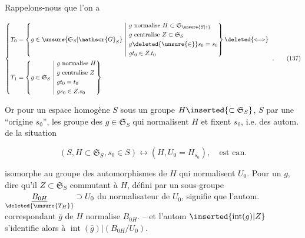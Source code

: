 Rappelons-nous que l'on a

\[\left\{\begin{aligned}
T_0&=\left\{g\in\unsure{\mathfrak{S}_S|\mathscr{G}_S}\ \middle|\ 
\begin{aligned}&g\text{ normalise }H\subset\mathfrak S_{\unsure{S|z}}\\&g\text{ centralise } Z\subset\mathfrak S_S\\&g\deleted{\unsure{\in}}s_0=s_0\\&gt_0\in Z.t_0\end{aligned}\right\}\deleted{\Longleftrightarrow}\\
T_1&=\left\{g\in\mathfrak S_S\ \middle|\ 
\begin{aligned}&g\text{ normalise }H\\&g\text{ centralise }Z\\&gt_0=t_0\\&gs_0\in Z.s_0\end{aligned}\right\}
\end{aligned}\right.\ .\tag*{(137)}\]


Or pour un espace homogène $S$ sous un groupe $H\inserted{\subset\mathfrak S_S}$, $S$ \unsure{ponctué|pointé} par une ``origine $s_0$'', les groupe des $g\in\mathfrak S_S$ qui normalisent $H$ et fixent $s_0$, i.e. des autom. de la situation

\[(S,H\subset\mathfrak S_S,s_0\in S)\longleftrightarrow(H,U_0=H_{s_0}),\quad\text{est can.}\]

isomorphe au groupe des automorphismes \inserted{$\bar g\deleted{\unsure{g}}$} de $H$ qui  normalisent $U_0$.  Pour un  $g$, dire qu'il   $Z\subset\mathfrak S_S$ commutant à  $H$, défini par un sous-groupe $\underset{\deleted{\unsure{T_H}}}{\underline{B_{0H}}}\supset U_0$ du normalisateur de $U_0$,  signifie que l'autom. correspondant $\bar g$ de $H$ normalise $B_{0H}$. -- et l'autom  $\inserted{\operatorname{int}(g)|Z}$ s'identifie alors à $\operatorname{int}(\bar g)|(B_{0H}/U_0)$.


